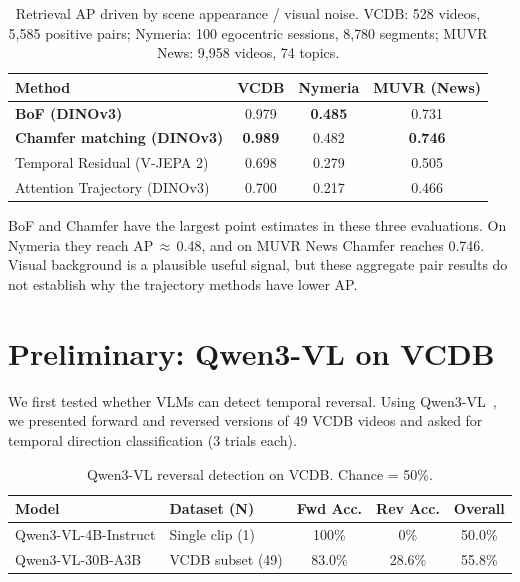 \documentclass{article}
\theoremstyle{remark}
\begin{document}
\begin{table}[h]
\centering
\caption{Retrieval AP driven by scene appearance / visual noise. VCDB: 528 videos, 5{,}585 positive pairs; Nymeria: 100 egocentric sessions, 8{,}780 segments; MUVR News: 9{,}958 videos, 74 topics.}
\label{tab:scene_matching}
\begin{tabular}{lccc}
\toprule
\textbf{Method} & \textbf{VCDB} & \textbf{Nymeria} & \textbf{MUVR (News)} \\
\midrule
\textbf{BoF (DINOv3)} & 0.979 & \textbf{0.485} & 0.731 \\
\textbf{Chamfer matching (DINOv3)} & \textbf{0.989} & 0.482 & \textbf{0.746} \\
Temporal Residual (V-JEPA 2) & 0.698 & 0.279 & 0.505 \\
Attention Trajectory (DINOv3) & 0.700 & 0.217 & 0.466 \\
\bottomrule
\end{tabular}
\end{table}

BoF and Chamfer have the largest point estimates in these three evaluations. On Nymeria they reach AP\,$\approx$\,0.48, and on MUVR News Chamfer reaches 0.746. Visual background is a plausible useful signal, but these aggregate pair results do not establish why the trajectory methods have lower AP.

\section{Preliminary: Qwen3-VL on VCDB}
\label{sec:qwen_vcdb}

We first tested whether VLMs can detect temporal reversal. Using Qwen3-VL~\cite{qwen3vl}, we presented forward and reversed versions of 49 VCDB videos and asked for temporal direction classification (3 trials each).

\begin{table}[h]
\centering
\caption{Qwen3-VL reversal detection on VCDB. Chance = 50\%.}
\label{tab:qwen_vcdb}
\begin{tabular}{llccc}
\toprule
\textbf{Model} & \textbf{Dataset (N)} & \textbf{Fwd Acc.} & \textbf{Rev Acc.} & \textbf{Overall} \\
\midrule
Qwen3-VL-4B-Instruct & Single clip (1) & 100\% & 0\% & 50.0\% \\
Qwen3-VL-30B-A3B & VCDB subset (49) & 83.0\% & 28.6\% & 55.8\% \\
\bottomrule
\end{tabular}
\end{table}
\end{document}
